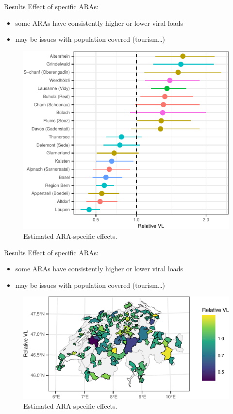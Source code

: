 \documentclass[
  ignorenonframetext,
]{beamer}
\begin{document}
\begin{frame}{Results}
\protect\hypertarget{results-4}{}
Effect of \alert{specific ARAs}:

\begin{itemize}
\item
  some ARAs have consistently higher or lower viral loads
\item
  may be issues with \alert{population} covered (tourism\ldots)
\end{itemize}

\begin{figure}
\includegraphics[width=0.5\linewidth]{2023-11-07_pres_files/figure-beamer/res3-1} \caption{Estimated ARA-specific effects.}\label{fig:res3}
\end{figure}
\end{frame}

\begin{frame}{Results}
\protect\hypertarget{results-5}{}
Effect of \alert{specific ARAs}:

\begin{itemize}
\item
  some ARAs have consistently higher or lower viral loads
\item
  may be issues with \alert{population} covered (tourism\ldots)
\end{itemize}

\begin{figure}
\includegraphics[width=0.8\linewidth]{2023-11-07_pres_files/figure-beamer/res4-1} \caption{Estimated ARA-specific effects.}\label{fig:res4}
\end{figure}
\end{frame}
\end{document}

